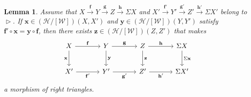 \documentclass[a4paper,reqno,10pt]{amsart}
\newtheorem{lemma}[lemma]{Lemma}
\theoremstyle{definition}
\theoremstyle{definition}
\theoremstyle{definition}
\theoremstyle{definition}
\theoremstyle{plain}
\newcommand{\CH}{\mathcal{H}}
\newcommand{\CW}{\mathcal{W}}
\begin{document}
\begin{lemma}\label{lem:RTR3}
Assume that $
X\xrightarrow{\mathbf{f}}Y\xrightarrow{\mathbf{g}}Z\xrightarrow{\mathbf{h}}\Sigma X
$
and 
$
X'\xrightarrow{\mathbf{f}'}Y'\xrightarrow{\mathbf{g}'}Z'\xrightarrow{\mathbf{h}'}\Sigma X'
$
belong to $\vartriangleright$.
If $\mathbf{x}\in(\CH/[\CW])(X,X')$ and $\mathbf{y}\in(\CH/[\CW])(Y,Y')$ satisfy
$\mathbf{f}'\circ \mathbf{x}=\mathbf{y}\circ \mathbf{f}$, then there exists $\mathbf{z}\in(\CH/[\CW])(Z,Z')$
that makes 
\[
\begin{tikzcd}[row sep=0.8cm, column sep=1.2cm]
X\arrow[r, "\mathbf{f}"]
\arrow[d, swap, "\mathbf{x}" ]
&Y\arrow[r, "\mathbf{g}"]
\arrow[d, "\mathbf{y}"]
&Z \arrow[r, "\mathbf{h}"]
\arrow[d, "\mathbf{z}"]
&\Sigma X
\arrow[d, "\Sigma\mathbf{x}"]
\\
X'\arrow[r, swap, "\mathbf{f}'"]
&Y'\arrow[r, swap, "\mathbf{g}'"]
&Z' \arrow[r, swap, "\mathbf{h}'"]
&\Sigma X'
\end{tikzcd}
\]
a morphism of right triangles.
\end{lemma}
\end{document}
